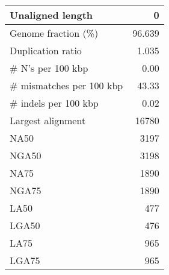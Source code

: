 \documentclass[12pt,a4paper]{article}
\begin{document}
\begin{table}[ht]
\begin{center}
\begin{tabular}{|l*{1}{|r}|}
Unaligned length & 0 \\ \hline
Genome fraction (\%) & 96.639 \\ \hline
Duplication ratio & 1.035 \\ \hline
\# N's per 100 kbp & 0.00 \\ \hline
\# mismatches per 100 kbp & 43.33 \\ \hline
\# indels per 100 kbp & 0.02 \\ \hline
Largest alignment & 16780 \\ \hline
NA50 & 3197 \\ \hline
NGA50 & 3198 \\ \hline
NA75 & 1890 \\ \hline
NGA75 & 1890 \\ \hline
LA50 & 477 \\ \hline
LGA50 & 476 \\ \hline
LA75 & 965 \\ \hline
LGA75 & 965 \\ \hline
\end{tabular}
\end{center}
\end{table}
\end{document}
